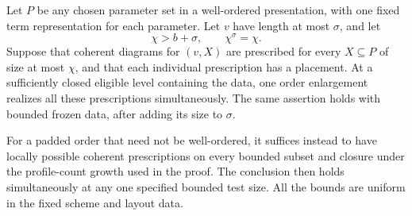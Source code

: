 \begin{lemma}
\label{calc:compact-placement}
Let $P$ be any chosen parameter set in a well-ordered presentation, with
one fixed term representation for each parameter.  Let $v$ have length
at most $\sigma$, and let
\[
 \chi>b+\sigma,\qquad \chi^\sigma=\chi.
\]
Suppose that coherent diagrams for $(v,X)$ are prescribed for every
$X\subseteq P$ of size at most $\chi$, and that each individual
prescription has a placement.  At a sufficiently closed eligible level
containing the data, one order enlargement realizes all these
prescriptions simultaneously.  The same assertion holds with bounded
frozen data, after adding its size to $\sigma$.

For a padded order that need not be well-ordered, it suffices instead to
have locally possible coherent prescriptions on every bounded subset
and closure under the profile-count growth used in the proof.  The
conclusion then holds simultaneously at any one specified bounded test
size.  All the bounds are uniform in the fixed scheme and layout data.
\end{lemma}

